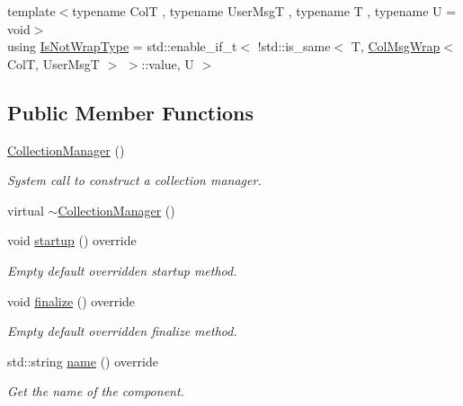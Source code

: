 \begin{DoxyCompactItemize}
\item 
{\footnotesize template$<$typename ColT , typename User\+MsgT , typename T , typename U  = void$>$ }\\using \hyperlink{structvt_1_1vrt_1_1collection_1_1_collection_manager_a18e3a17d9eb086c6c2f499242b7faa1e}{Is\+Not\+Wrap\+Type} = std\+::enable\+\_\+if\+\_\+t$<$ !std\+::is\+\_\+same$<$ T, \hyperlink{structvt_1_1vrt_1_1collection_1_1_col_msg_wrap}{Col\+Msg\+Wrap}$<$ ColT, User\+MsgT $>$ $>$\+::value, U $>$
\end{DoxyCompactItemize}
\subsection*{Public Member Functions}
\begin{DoxyCompactItemize}
\item 
\hyperlink{structvt_1_1vrt_1_1collection_1_1_collection_manager_ad6c6c75f1f54ae5470847311256ae8c3}{Collection\+Manager} ()
\begin{DoxyCompactList}\small\item\em System call to construct a collection manager. \end{DoxyCompactList}\item 
virtual \hyperlink{structvt_1_1vrt_1_1collection_1_1_collection_manager_aea0c10371b37041bcc855eef0c767b85}{$\sim$\+Collection\+Manager} ()
\item 
void \hyperlink{structvt_1_1vrt_1_1collection_1_1_collection_manager_ac71095016a20dd9607f2f937bf35305e}{startup} () override
\begin{DoxyCompactList}\small\item\em Empty default overridden startup method. \end{DoxyCompactList}\item 
void \hyperlink{structvt_1_1vrt_1_1collection_1_1_collection_manager_afafcdbf36f42835471218b654252031c}{finalize} () override
\begin{DoxyCompactList}\small\item\em Empty default overridden finalize method. \end{DoxyCompactList}\item 
std\+::string \hyperlink{structvt_1_1vrt_1_1collection_1_1_collection_manager_af7cc4c83ae2792595eee99a3206ed633}{name} () override
\begin{DoxyCompactList}\small\item\em Get the name of the component. \end{DoxyCompactList}\item 

\end{DoxyCompactItemize}
